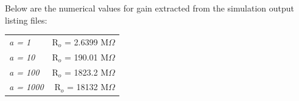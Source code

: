 \documentclass[12pt]{article}
\begin{document}
\begin {figure}[htb!]
  \begin{center}
    	\resizebox{0.6\textwidth}{!}{}
  \end	{center}
\end {figure}
\FloatBarrier
Below are the numerical values for gain extracted from the simulation output listing files:\\
\begin{center}
\begin{tabular}{l r}
\textit{a = 1} & R$_o$ = 2.6399 M$\Omega$\\
\textit{a = 10} & R$_o$ = 190.01 M$\Omega$\\
\textit{a = 100} & R$_o$ = 1823.2 M$\Omega$\\
\textit{a = 1000} & R$_o$ = 18132 M$\Omega$\\
\end{tabular}
\end{center}
\pagebreak
\end{document}
